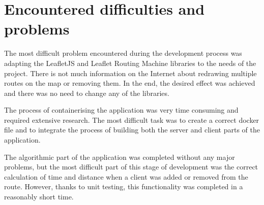 \documentclass[a4paper,twoside,12pt]{book}
\newcounter{PagesWithoutNumbers}
\begin{document}
\section{Encountered difficulties and problems}
The most difficult problem encountered during the development process was adapting the LeafletJS and Leaflet Routing Machine libraries to the needs of the project. There is not much information on the Internet about redrawing multiple routes on the map or removing them. In the end, the desired effect was achieved and there was no need to change any of the libraries. 

The process of containerising the application was very time consuming and required extensive research. The most difficult task was to create a correct docker file and to integrate the process of building both the server and client parts of the application.

The algorithmic part of the application was completed without any major problems, but the most difficult part of this stage of development was the correct calculation of time and distance when a client was added or removed from the route. However, thanks to unit testing, this functionality was completed in a reasonably short time.

 

 


\backmatter
{}
\setcounter{page}{\value{PagesWithoutNumbers}}

\pagestyle{onlyPageNumbers}

%
%

\printbibliography
\end{document}
